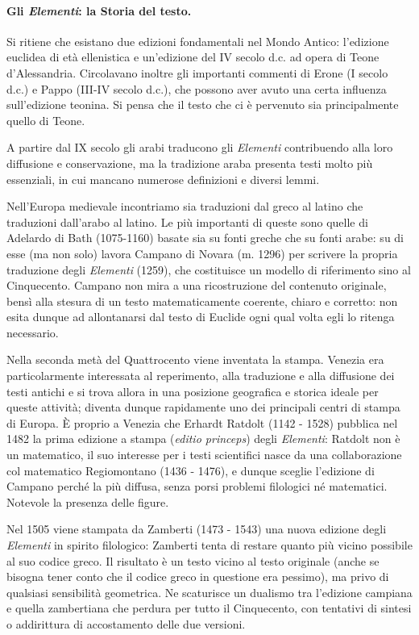 \paragraph{Gli \textit{Elementi}: la Storia del testo.} Si ritiene che esistano due edizioni fondamentali nel Mondo Antico: l'edizione euclidea di et\`a ellenistica e un'edizione del IV secolo d.c. ad opera di Teone d'Alessandria. Circolavano inoltre gli importanti commenti di Erone (I secolo d.c.) e Pappo (III-IV secolo d.c.), che possono aver avuto una certa influenza sull'edizione teonina. Si pensa che il testo che ci \`e pervenuto sia principalmente quello di Teone.
\par A partire dal IX secolo gli arabi traducono gli \textit{Elementi} contribuendo alla loro diffusione e conservazione, ma la tradizione araba presenta testi molto pi\`u essenziali, in cui mancano numerose definizioni e diversi lemmi.
\par Nell'Europa medievale incontriamo sia traduzioni dal greco al latino che traduzioni dall'arabo al latino. Le pi\`u importanti di queste sono quelle di Adelardo di Bath (1075-1160) basate sia su fonti greche che su fonti arabe: su di esse (ma non solo) lavora Campano di Novara (m. 1296) per scrivere la propria traduzione degli \textit{Elementi} (1259), che costituisce un modello di riferimento sino al Cinquecento. Campano non mira a una ricostruzione del contenuto originale, bens\`i alla stesura di un testo matematicamente coerente, chiaro e corretto: non esita dunque ad allontanarsi dal testo di Euclide ogni qual volta egli lo ritenga necessario.
\par Nella seconda met\`a del Quattrocento viene inventata la stampa. Venezia era particolarmente interessata al reperimento, alla traduzione e alla diffusione dei testi antichi e si trova allora in una posizione geografica e storica ideale per queste attivit\`a; diventa dunque rapidamente uno dei principali centri di stampa di Europa. \`E proprio a Venezia che Erhardt Ratdolt (1142 - 1528) pubblica nel 1482 la prima edizione a stampa (\textit{editio princeps}) degli \textit{Elementi}: Ratdolt non \`e un matematico, il suo interesse per i testi scientifici nasce da una collaborazione col matematico Regiomontano (1436 - 1476), e dunque sceglie l'edizione di Campano perch\'e la pi\`u diffusa, senza porsi problemi filologici n\'e matematici. Notevole la presenza delle figure.
\par Nel 1505 viene stampata da Zamberti (1473 - 1543) una nuova edizione degli \textit{Elementi} in spirito filologico: Zamberti tenta di restare quanto pi\`u vicino possibile al suo codice greco. Il risultato \`e un testo vicino al testo originale (anche se bisogna tener conto che il codice greco in questione era pessimo), ma privo di qualsiasi sensibilit\`a geometrica. Ne scaturisce un dualismo tra l'edizione campiana e quella zambertiana che perdura per tutto il Cinquecento, con tentativi di sintesi o addirittura di accostamento delle due versioni.
